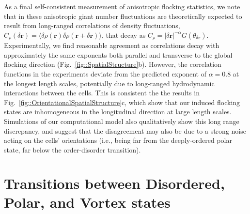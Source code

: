 \documentclass[reprint,unsortedaddress,amsmath,amssymb,aps,pre]{revtex4-2}
\begin{document}
As a final self-consistent measurement of anisotropic flocking statistics, we note that in these anisotropic giant number fluctuations are theoretically expected to result from long-ranged correlations of density fluctuations, $C_{\rho}(\delta\mathbf{r})=\langle{\delta\rho(\mathbf{r})\delta\rho(\mathbf{r}+\delta\mathbf{r})}\rangle$, that decay as $C_{\rho}=|\delta\mathbf{r}|^{-\alpha}G(\theta_{\delta\mathbf{r}})$. Experimentally, we find reasonable agreement as correlations decay with approximately the same exponents both parallel and transverse to the global flocking direction (Fig.~\ref{fig::SpatialStructure}b). However, the correlation functions in the experiments deviate from the predicted exponent of $\alpha=0.8$ at the longest length scales, potentially due to long-ranged hydrodynamic interactions between the cells.  This is consistent the the results in Fig.~\ref{fig::OrientationalSpatialStructure}c, which show that our induced flocking states are inhomogeneous in the longitudinal direction at large length scales. Simulations of our computational model also qualitatively show this long range discrepancy, and suggest that the disagreement may also be due to a strong noise acting on the cells' orientations (i.e., being far from the deeply-ordered polar state, far below the order-disorder transition).

\section{Transitions between Disordered, Polar, and Vortex states}
\end{document}
